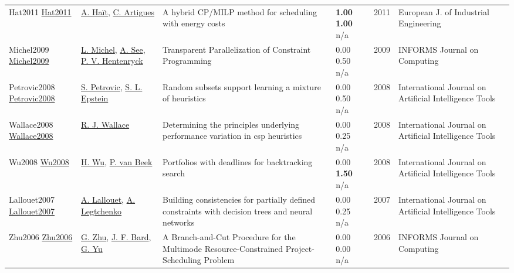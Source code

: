 {\begin{longtable}{p{3cm}p{5cm}p{10cm}p{1cm}rp{2.5cm}l}
Hat2011 \href{http://dx.doi.org/10.1504/ejie.2011.042742}{Hat2011} & \hyperref[auth:a1161]{A. Haït}, \hyperref[auth:a6]{C. Artigues} & \cellcolor{green!10}A hybrid CP/MILP method for scheduling with energy costs & \noindent{}\textbf{1.00} \textbf{1.00} n/a & 2011 & European J. of Industrial Engineering & \cite{Hat2011}\\
Michel2009 \href{http://dx.doi.org/10.1287/ijoc.1080.0313}{Michel2009} & \hyperref[auth:a32]{L. Michel}, \hyperref[auth:a1804]{A. See}, \hyperref[auth:a148]{P. V. Hentenryck} & Transparent Parallelization of Constraint Programming & \noindent{}\textcolor{black!50}{0.00} 0.50 n/a & 2009 & \cellcolor{red!20}INFORMS Journal on Computing & \cite{Michel2009}\\
Petrovic2008 \href{http://dx.doi.org/10.1142/s0218213008004023}{Petrovic2008} & \hyperref[auth:a1858]{S. Petrovic}, \hyperref[auth:a1859]{S. L. Epstein} & \cellcolor{green!10}Random subsets support learning a mixture of heuristics & \noindent{}\textcolor{black!50}{0.00} 0.50 n/a & 2008 & International Journal on Artificial Intelligence Tools & \cite{Petrovic2008}\\
Wallace2008 \href{http://dx.doi.org/10.1142/s0218213008004199}{Wallace2008} & \hyperref[auth:a1267]{R. J. Wallace} & Determining the principles underlying performance variation in csp heuristics & \noindent{}\textcolor{black!50}{0.00} 0.25 n/a & 2008 & International Journal on Artificial Intelligence Tools & \cite{Wallace2008}\\
Wu2008 \href{http://dx.doi.org/10.1142/s0218213008004187}{Wu2008} & \hyperref[auth:a2057]{H. Wu}, \hyperref[auth:a609]{P. van Beek} & Portfolios with deadlines for backtracking search & \noindent{}\textcolor{black!50}{0.00} \textbf{1.50} n/a & 2008 & International Journal on Artificial Intelligence Tools & \cite{Wu2008}\\
Lallouet2007 \href{http://dx.doi.org/10.1142/s0218213007003503}{Lallouet2007} & \hyperref[auth:a427]{A. Lallouet}, \hyperref[auth:a1932]{A. Legtchenko} & Building consistencies for partially defined constraints with decision trees and neural networks & \noindent{}\textcolor{black!50}{0.00} 0.25 n/a & 2007 & International Journal on Artificial Intelligence Tools & \cite{Lallouet2007}\\
Zhu2006 \href{http://dx.doi.org/10.1287/ijoc.1040.0121}{Zhu2006} & \hyperref[auth:a1526]{G. Zhu}, \hyperref[auth:a1527]{J. F. Bard}, \hyperref[auth:a1528]{G. Yu} & A Branch-and-Cut Procedure for the Multimode Resource-Constrained Project-Scheduling Problem & \noindent{}\textcolor{black!50}{0.00} \textcolor{black!50}{0.00} n/a & 2006 & \cellcolor{red!20}INFORMS Journal on Computing & \cite{Zhu2006}\\

\end{longtable}}

